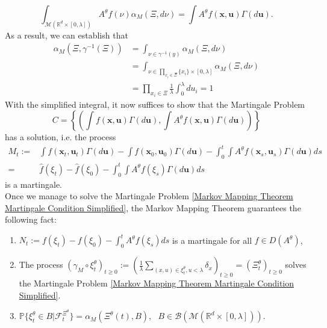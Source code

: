 \documentclass[12pt]{article}
\def \hat{\widehat}
\begin{document}
\begin{equation}
\int_{\mathcal{M}(\mathbb{R}^d\times [0,\lambda])}A^{\theta}f(\nu)\alpha_M(\Xi,d\nu)= \int   A^{\theta}f(\textbf{x},\textbf{u})\Gamma(d\textbf{u}). 
\end{equation}
As a result, we can establish that
\begin{equation}
\begin{aligned}
\alpha_M(\Xi,\gamma^{-1}(\Xi)) &= \int_{\nu \in \gamma^{-1}(y)}\alpha_M (\Xi,d\nu) \\
&= \int_{\nu \in \prod_{x_i \in \Xi} \{x_i\}\times [0,\lambda]}\alpha_M (\Xi,d\nu)\\
&= \prod_{x_i \in \Xi}\frac{1}{\lambda}\int_{0}^{\lambda} du_i =1
\end{aligned}
\end{equation}
With the simplified integral, it now suffices to show that the Martingale Problem 
\begin{equation}\label{Markov Mapping Theorem Martingale Condition Simplified}
C = \left\{\left(\int   f(\textbf{x},\textbf{u})\Gamma(d\textbf{u}),\int   A^{\theta}f(\textbf{x},\textbf{u})\Gamma(d\textbf{u})\right)\right\}    
\end{equation}
has a solution, i.e. the process
\begin{equation}
\begin{aligned}
M_t:=& \int   f(\textbf{x}_t,\textbf{u}_t)\Gamma(d\textbf{u})-\int   f(\textbf{x}_0,\textbf{u}_0)\Gamma(d\textbf{u})-\int_{0}^{t}\int   A^{\theta}f(\textbf{x}_s,\textbf{u}_s)\Gamma(d\textbf{u})ds\\
=&\hat{f}(\xi_t)-\hat{f}(\xi_0)-\int_{0}^{t}\int   A^{\theta}f(\xi_s)\Gamma(d\textbf{u})ds
\end{aligned}    
\end{equation}
is a martingale.\\
Once we manage to solve the Martingale Problem \eqref{Markov Mapping Theorem Martingale Condition Simplified}, the Markov Mapping Theorem guarantees the following fact:
\begin{enumerate}
    \item $N_t:=    f(\xi_t)-   f(\xi_0)-\int_{0}^{t}  A^{\theta}f(\xi_s)ds$ is a martingale for all $f\in D(A^{\theta})$,
    \item The process $(\gamma_M \circ \xi^{\theta}_t)_{t \geq 0}:= \left(\frac{1}{\lambda}\sum_{(x,u)\in \xi^{\theta}_t, u < \lambda} \delta_x\right)_{t \geq 0}=(\Xi^{\theta}_t)_{t \geq 0}$ solves the Martingale Problem \eqref{Markov Mapping Theorem Martingale Condition Simplified}.
    \item $\mathbb{P}\{\xi^{\theta}_t \in B | \mathcal{F}^{\Xi^{\theta}}_t\}=\alpha_M(\Xi^{\theta}(t),B), ~~~B \in \mathcal{B}(\mathcal{M}(\mathbb{R}^d \times [0,\lambda])).$
\end{enumerate}
\end{document}
